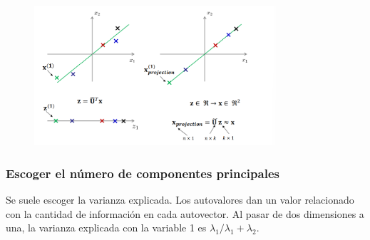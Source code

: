 \begin{figure}[h]
\centering
\includegraphics[width = 0.8\textwidth]{figs/resumen-PCA.png}
\end{figure}

\subsubsection{Escoger el número de componentes principales}
Se suele escoger la varianza explicada. Los autovalores dan un valor relacionado con la cantidad de información en cada autovector. Al pasar de dos dimensiones a una, la varianza explicada con la variable 1 es $\lambda_1 / \lambda_1 + \lambda_2$.